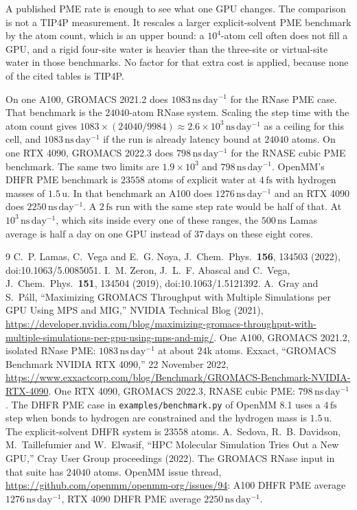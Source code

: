 A published PME rate is enough to see what one GPU changes.
The comparison is not a TIP4P measurement.
It rescales a larger explicit-solvent PME benchmark by the atom
count, which is an upper bound: a $10^{4}$-atom cell often does not
fill a GPU, and a rigid four-site water is heavier than the
three-site or virtual-site water in those benchmarks.
No factor for that extra cost is applied, because none of the cited
tables is TIP4P.

On one A100, GROMACS 2021.2 does $1083\,\mathrm{ns\,day^{-1}}$ for
the RNase PME case.\cite{nvidia2021}
That benchmark is the $24040$-atom RNase system.\cite{sedova2022}
Scaling the step time with the atom count gives
$1083\times(24040/9984)\approx 2.6\times 10^{3}\,\mathrm{ns\,day^{-1}}$
as a ceiling for this cell, and $1083\,\mathrm{ns\,day^{-1}}$ if the
run is already latency bound at $24040$ atoms.
On one RTX 4090, GROMACS 2022.3 does
$798\,\mathrm{ns\,day^{-1}}$ for the RNASE cubic PME
benchmark.\cite{exxact2022}
The same two limits are $1.9\times 10^{3}$ and
$798\,\mathrm{ns\,day^{-1}}$.
OpenMM's DHFR PME benchmark is $23558$ atoms of explicit water at
$4\,\mathrm{fs}$ with hydrogen masses of $1.5\,\mathrm{u}$.\cite{openmmbench}
In that benchmark an A100 does $1276\,\mathrm{ns\,day^{-1}}$ and an
RTX 4090 does $2250\,\mathrm{ns\,day^{-1}}$.\cite{openmm94}
A $2\,\mathrm{fs}$ run with the same step rate would be half of
that.
At $10^{3}\,\mathrm{ns\,day^{-1}}$, which sits inside every one of
these ranges, the $500\,\mathrm{ns}$ Lamas average is half a day on
one GPU instead of $37\,\mathrm{days}$ on these eight cores.

\begin{thebibliography}{9}
C.~P. Lamas, C.~Vega and E.~G. Noya,
J.~Chem.\ Phys.\ \textbf{156}, 134503 (2022),
doi:10.1063/5.0085051.
I.~M. Zeron, J.~L.~F. Abascal and C.~Vega,
J.~Chem.\ Phys.\ \textbf{151}, 134504 (2019),
doi:10.1063/1.5121392.
A.~Gray and S.~P\'all,
``Maximizing GROMACS Throughput with Multiple Simulations per GPU
Using MPS and MIG,'' NVIDIA Technical Blog (2021),
\url{https://developer.nvidia.com/blog/maximizing-gromacs-throughput-with-multiple-simulations-per-gpu-using-mps-and-mig/}.
One A100, GROMACS 2021.2, isolated RNase PME:
$1083\,\mathrm{ns\,day^{-1}}$ at about $24\mathrm{k}$ atoms.
Exxact, ``GROMACS Benchmark NVIDIA RTX 4090,'' 22 November 2022,
\url{https://www.exxactcorp.com/blog/Benchmark/GROMACS-Benchmark-NVIDIA-RTX-4090}.
One RTX 4090, GROMACS 2022.3, RNASE cubic PME:
$798\,\mathrm{ns\,day^{-1}}$.
The DHFR PME case in \texttt{examples/benchmark.py} of OpenMM 8.1
uses a $4\,\mathrm{fs}$ step when bonds to hydrogen are constrained
and the hydrogen mass is $1.5\,\mathrm{u}$.
The explicit-solvent DHFR system is $23558$ atoms.
A.~Sedova, R.~B. Davidson, M.~Taillefumier and W.~Elwasif,
``HPC Molecular Simulation Tries Out a New GPU,''
Cray User Group proceedings (2022).
The GROMACS RNase input in that suite has $24040$ atoms.
OpenMM issue thread,
\url{https://github.com/openmm/openmm-org/issues/94}:
A100 DHFR PME average $1276\,\mathrm{ns\,day^{-1}}$,
RTX 4090 DHFR PME average $2250\,\mathrm{ns\,day^{-1}}$.
\end{thebibliography}

